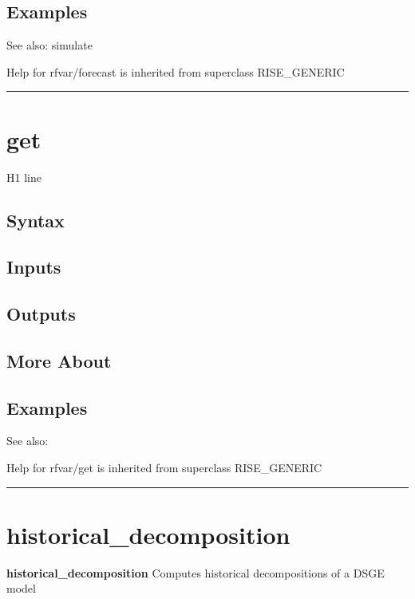 \documentclass[letterpaper,10pt,english]{sphinxmanual}
\begin{document}
\subsection{Examples}
\label{classes/models/@rfvar/rfvar:id25}
See also: simulate

Help for rfvar/forecast is inherited from superclass RISE\_GENERIC


\bigskip\hrule{}\bigskip



\section{get}
\label{classes/models/@rfvar/rfvar:id26}\label{classes/models/@rfvar/rfvar:get}
H1 line


\subsection{Syntax}
\label{classes/models/@rfvar/rfvar:id27}

\subsection{Inputs}
\label{classes/models/@rfvar/rfvar:id28}

\subsection{Outputs}
\label{classes/models/@rfvar/rfvar:id29}

\subsection{More About}
\label{classes/models/@rfvar/rfvar:id30}

\subsection{Examples}
\label{classes/models/@rfvar/rfvar:id31}
See also:

Help for rfvar/get is inherited from superclass RISE\_GENERIC


\bigskip\hrule{}\bigskip



\section{historical\_decomposition}
\label{classes/models/@rfvar/rfvar:id32}\label{classes/models/@rfvar/rfvar:historical-decomposition}
\textbf{historical\_decomposition} Computes historical decompositions of a DSGE model
\end{document}
